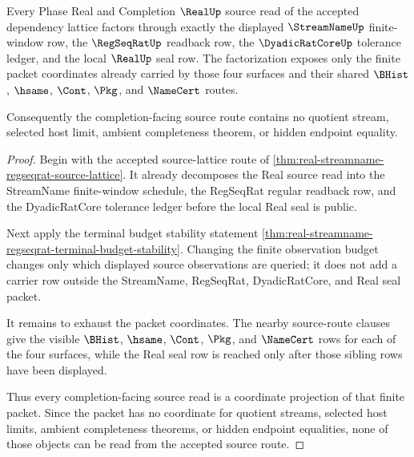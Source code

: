 \begin{theorem}
\label{thm:real-streamname-regseqrat-dyadic-source-exhaustion}
Every Phase Real and Completion $\RealUp$ source read of the accepted
dependency lattice factors through exactly the displayed
$\StreamNameUp$ finite-window row, the $\RegSeqRatUp$ readback row, the
$\DyadicRatCoreUp$ tolerance ledger, and the local $\RealUp$ seal row. The
factorization exposes only the finite packet coordinates already carried by
those four surfaces and their shared $\BHist$, $\hsame$, $\Cont$, $\Pkg$, and
$\NameCert$ routes.

Consequently the completion-facing source route contains no quotient stream,
selected host limit, ambient completeness theorem, or hidden endpoint equality.
\end{theorem}
\begin{proof}
Begin with the accepted source-lattice route of
\autoref{thm:real-streamname-regseqrat-source-lattice}. It already decomposes
the Real source read into the StreamName finite-window schedule, the
RegSeqRat regular readback row, and the DyadicRatCore tolerance ledger before
the local Real seal is public.

Next apply the terminal budget stability statement
\autoref{thm:real-streamname-regseqrat-terminal-budget-stability}. Changing
the finite observation budget changes only which displayed source observations
are queried; it does not add a carrier row outside the StreamName, RegSeqRat,
DyadicRatCore, and Real seal packet.

It remains to exhaust the packet coordinates. The nearby source-route clauses
give the visible $\BHist$, $\hsame$, $\Cont$, $\Pkg$, and $\NameCert$ rows for
each of the four surfaces, while the Real seal row is reached only after those
sibling rows have been displayed.

Thus every completion-facing source read is a coordinate projection of that
finite packet. Since the packet has no coordinate for quotient streams,
selected host limits, ambient completeness theorems, or hidden endpoint
equalities, none of those objects can be read from the accepted source route.
\end{proof}

